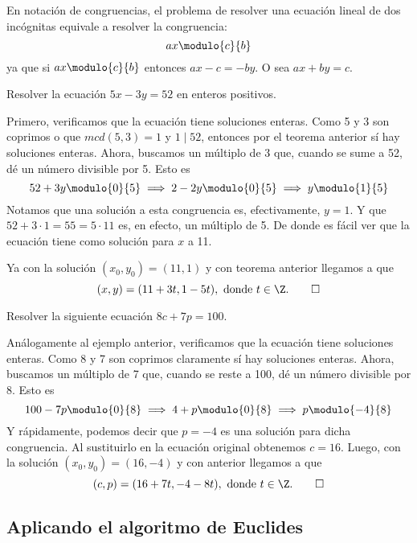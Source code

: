 En notación de congruencias, el problema de resolver una ecuación lineal de dos incógnitas equivale a resolver la congruencia:
\[
    ax \modulo{c}{b}
\]
ya que si $ax \modulo{c}{b}$ entonces $ax-c=-by$.
O sea $ax+by = c$.

\begin{example}
    Resolver la ecuación $5x-3y=52$ en enteros positivos.
\end{example}
\begin{solution}
    Primero, verificamos que la ecuación tiene soluciones enteras.
    Como 5 y 3 son coprimos o que $mcd(5,3)=1$ y $1\mid52$, entonces por el teorema anterior sí hay soluciones enteras.
    Ahora, buscamos un múltiplo de 3 que, cuando se sume a 52, dé un número divisible por 5.
    Esto es
    \[
        52+3y \modulo{0}{5} \implies 2-2y \modulo{0}{5} \implies y \modulo{1}{5}
    \]
    Notamos que una solución a esta congruencia es, efectivamente, $y = 1$.
    Y que $52 + 3\cdot 1 = 55 = 5\cdot 11$ es, en efecto, un múltiplo de 5.
    De donde es fácil ver que la ecuación tiene como solución para $x$ a 11.

    Ya con la solución $(x_0,y_0)=(11,1)$ y con teorema anterior llegamos a que
    \[
        (x,y) = (11+3t,1-5t), \mbox{ donde } t\in \Z.\qedhere
    \]
\end{solution}

\begin{example}
    Resolver la siguiente ecuación $8c+7p=100$.
\end{example}
\begin{solution}
    Análogamente al ejemplo anterior, verificamos que la ecuación tiene soluciones enteras.
    Como 8 y 7 son coprimos claramente sí hay soluciones enteras.
    Ahora, buscamos un múltiplo de 7 que, cuando se reste a 100, dé un número divisible por 8.
    Esto es
    \[
        100-7p \modulo{0}{8} \implies 4+p \modulo{0}{8} \implies p \modulo{-4}{8}
    \]
    Y rápidamente, podemos decir que $p = -4$ es una solución para dicha congruencia.
    Al sustituirlo en la ecuación original obtenemos $c=16$.
    Luego, con la solución $(x_0,y_0)=(16,-4)$ y con anterior llegamos a que
    \[
        (c,p) = (16+7t,-4-8t), \mbox{ donde } t\in \Z.\qedhere
    \]
\end{solution}


\subsection{Aplicando el algoritmo de Euclides}

